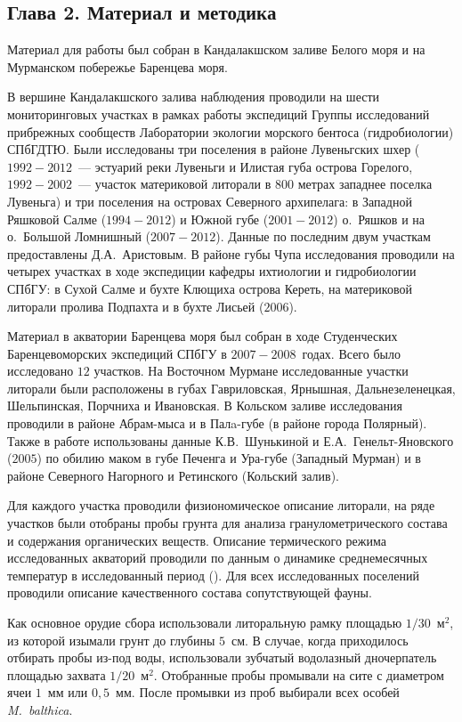 \subsection*{Глава 2. Материал и методика}

Материал для работы был собран в Кандалакшском заливе Белого моря и на Мурманском побережье Баренцева моря.

В вершине Кандалакшского залива наблюдения проводили на шести мониторинговых участках в рамках работы экспедиций Группы исследований прибрежных сообществ Лаборатории экологии морского бентоса (гидробиологии) СПбГДТЮ. 
Были исследованы три поселения в районе Лувеньгских шхер ($1992 - 2012$~--- эстуарий реки Лувеньги и Илистая губа острова Горелого, $1992 - 2002$~--- участок материковой литорали в $800$ метрах западнее поселка Лувеньга) и три поселения на островах Северного архипелага: в Западной Ряшковой Салме ($1994 - 2012$) и Южной губе ($2001 - 2012$) о.~Ряшков и на о.~Большой Ломнишный ($2007 - 2012$).
Данные по последним двум участкам предоставлены Д.\:А.~Аристовым.
В районе губы Чупа исследования проводили на четырех участках в ходе экспедиции кафедры ихтиологии и гидробиологии СПбГУ: в Сухой Салме и бухте Клющиха острова Кереть, на материковой литорали пролива Подпахта и в бухте Лисьей ($2006$).

Материал  в акватории Баренцева моря  был  собран в ходе Студенческих Баренцевоморских экспедиций СПбГУ в $2007 - 2008$~годах. 
Всего было исследовано $12$ участков.
На Восточном   Мурмане исследованные участки литорали  были   расположены   в   губах   Гавриловская,  Ярнышная, Дальнезеленецкая, Шельпинская, Порчниха и Ивановская.
В   Кольском   заливе исследования проводили в районе Абрам-мыса и в Палa-губе (в районе города Полярный). 
Также в работе использованы данные К.\:В.~Шунькиной и Е.\:А.~Генельт-Яновского ($2005$) по обилию маком в губе Печенга и Ура-губе (Западный Мурман) и в районе Северного Нагорного и Ретинского (Кольский залив).

Для каждого участка проводили физиономическое описание литорали, на ряде участков были отобраны пробы грунта для анализа гранулометрического состава и содержания органических веществ.
Описание термического режима исследованных акваторий проводили по данным о динамике среднемесячных температур в исследованный период (\cite{KGZ_letopis, rp5_Kandalaksha, pinro}).
Для всех исследованных поселений проводили описание качественного состава сопутствующей фауны.

Как основное орудие сбора использовали литоральную рамку площадью $1/30$~м$^2$, из которой изымали грунт до глубины $5$~см. 
В случае, когда приходилось отбирать пробы из-под воды, использовали зубчатый водолазный дночерпатель площадью захвата $1/20$~м$^2$.
Отобранные пробы промывали на сите с диаметром ячеи $1$~мм или $0,5$~мм. 
После промывки из   проб   выбирали   всех   особей  {\it M.~balthica}.

